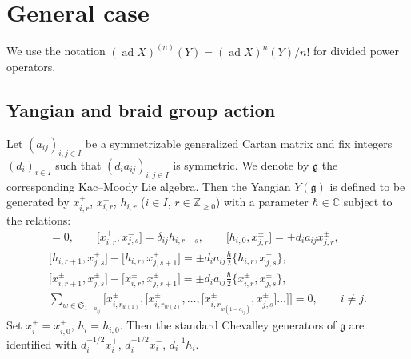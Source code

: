 \documentclass[10pt,a4paper]{amsart}
\theoremstyle{definition}
\numberwithin{equation}{section}
\DeclareMathOperator{\ad}{ad}
\newcommand{\bbC}{\mathbb{C}}
\newcommand{\frakg}{\mathfrak{g}}
\begin{document}
\appendix
\section{General case}\label{appendixA}
We use the notation $(\ad X)^{(n)}(Y) = (\ad X)^{n}(Y) / n!$ for divided power operators.

\subsection{Yangian and braid group action}

Let $(a_{ij})_{i,j \in I}$ be a symmetrizable generalized Cartan matrix and fix integers $(d_i)_{i \in I}$ such that $(d_i a_{ij})_{i,j \in I}$ is symmetric. We denote by $\frakg$ the corresponding Kac--Moody Lie algebra. Then the Yangian $Y(\frakg)$ is defined to be generated by $x_{i,r}^{+}$, $x_{i,r}^{-}$, $h_{i,r}$ ($i \in I$, $r \in \mathbb{Z}_{\geq 0}$) with a parameter $\hbar \in \bbC$ subject to the relations:
\begin{gather*}
[h_{i,r}, h_{j,s}] = 0, \qquad \big[x_{i,r}^{+}, x_{j,s}^{-}\big] = \delta_{ij} h_{i, r+s}, \qquad \big[h_{i,0}, x_{j,r}^{\pm}\big] = \pm d_i a_{ij} x_{j,r}^{\pm},\\
\big[h_{i, r+1}, x_{j, s}^{\pm}\big] - \big[h_{i, r}, x_{j, s+1}^{\pm}\big] = \pm d_i a_{ij} \tfrac{\hbar}{2} \big\{h_{i, r}, x_{j, s}^{\pm}\big\},\\
\big[x_{i, r+1}^{\pm}, x_{j, s}^{\pm}\big] - \big[x_{i, r}^{\pm}, x_{j, s+1}^{\pm}\big] = \pm d_i a_{ij}\tfrac{\hbar}{2} \big\{x_{i, r}^{\pm}, x_{j, s}^{\pm}\big\},\\
\sum_{w \in \mathfrak{S}_{1 - a_{ij}}}\big[x_{i,r_{w(1)}}^{\pm}, \big[x_{i,r_{w(2)}}^{\pm}, \dots, \big[x_{i,r_{w(1 - a_{ij})}}^{\pm}, x_{j,s}^{\pm}\big]\dots\big]\big] = 0, \qquad i \neq j.
\end{gather*}
Set $x_{i}^{\pm} = x_{i,0}^{\pm}$, $h_{i} = h_{i,0}$. Then the standard Chevalley generators of $\frakg$ are identified with $d_i^{-1/2} x_i^+$, $d_i^{-1/2} x_i^-$, $d_i^{-1}h_i$.
\end{document}

